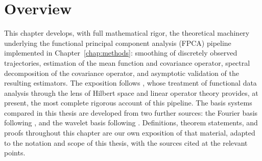 \section{Overview}
\label{sec:theory_overview}

This chapter develops, with full mathematical rigor, the theoretical
machinery underlying the functional principal component analysis (FPCA)
pipeline implemented in Chapter~\ref{chap:methods}: smoothing of discretely
observed trajectories, estimation of the mean function and covariance
operator, spectral decomposition of the covariance operator, and asymptotic
validation of the resulting estimators. The exposition follows
\cite{hsingeubank2015}, whose treatment of functional data analysis through
the lens of Hilbert space and linear operator theory provides, at present,
the most complete rigorous account of this pipeline. The basis systems
compared in this thesis are developed from two further sources: the Fourier
basis following \cite{ramsay2005}, and the wavelet basis following
\cite{vidakovic1999}. Definitions, theorem statements, and proofs throughout
this chapter are our own exposition of that material, adapted to the notation
and scope of this thesis, with the sources cited at the relevant points.

